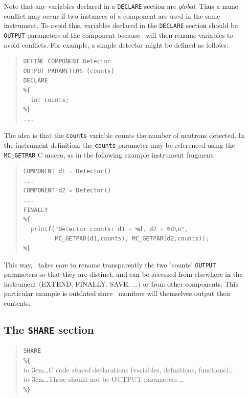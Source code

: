 Note that any variables declared in a \verb+DECLARE+ section are
\emph{global}. Thus a name conflict may occur if two instances of a
component are used in the same instrument. To avoid this, variables
declared in the \texttt{DECLARE} section should be \texttt{OUTPUT} parameters of
the component because \MCS\ will then rename variables to avoid conflicts.
For example, a simple detector might be defined as follows:
\begin{quote}
\begin{verbatim}
DEFINE COMPONENT Detector
OUTPUT PARAMETERS (counts)
DECLARE
%{
  int counts;
%}
...
\end{verbatim}
\end{quote}
The idea is that the \texttt{counts} variable counts the number of
neutrons detected. In the instrument definition, the \texttt{counts}
parameter may be referenced using the \verb+MC_GETPAR+ C macro, as in
the following example instrument fragment:\label{mcgetpar}
\begin{quote}
\begin{verbatim}
COMPONENT d1 = Detector()
...
COMPONENT d2 = Detector()
...
FINALLY
%{
  printf("Detector counts: d1 = %d, d2 = %d\n",
         MC_GETPAR(d1,counts), MC_GETPAR(d2,counts));
%}
\end{verbatim}
\end{quote}
This way, \MCS\ takes care to rename transparently the two 'counts'
\texttt{OUTPUT} parameters so that they are distinct, and can be
accessed from elsewhere in the instrument (EXTEND, FINALLY, SAVE, ...)
or from other components. This particular example is outdated since
\MCS\ monitors will themselves output their contents.

\subsection{The \texttt{SHARE} section}
\label{s:comp-share}
\begin{quote}
  \texttt{SHARE} \\
  \verb|%{| \\
  \hbox to 3em{}\ldots C code \emph{shared} declarations (variables, definitions, functions)\ldots \\
  \hbox to 3em{}\ldots These should not be OUTPUT parameters \ldots \\
  \verb|%}|
\end{quote}

